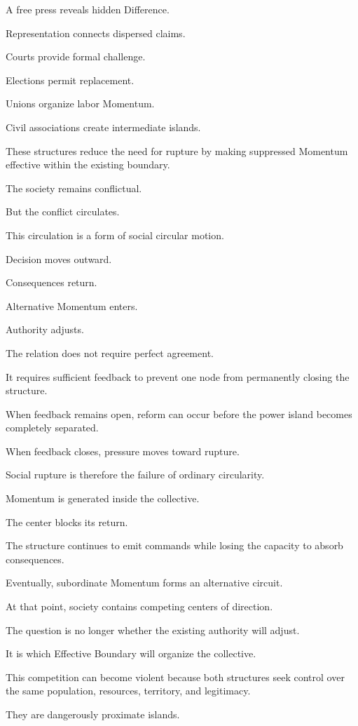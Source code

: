 A free press reveals hidden Difference.

Representation connects dispersed claims.

Courts provide formal challenge.

Elections permit replacement.

Unions organize labor Momentum.

Civil associations create intermediate islands.

These structures reduce the need for rupture by making suppressed Momentum effective within the existing boundary.

The society remains conflictual.

But the conflict circulates.

This circulation is a form of social circular motion.

Decision moves outward.

Consequences return.

Alternative Momentum enters.

Authority adjusts.

The relation does not require perfect agreement.

It requires sufficient feedback to prevent one node from permanently closing the structure.

When feedback remains open, reform can occur before the power island becomes completely separated.

When feedback closes, pressure moves toward rupture.

Social rupture is therefore the failure of ordinary circularity.

Momentum is generated inside the collective.

The center blocks its return.

The structure continues to emit commands while losing the capacity to absorb consequences.

Eventually, subordinate Momentum forms an alternative circuit.

At that point, society contains competing centers of direction.

The question is no longer whether the existing authority will adjust.

It is which Effective Boundary will organize the collective.

This competition can become violent because both structures seek control over the same population, resources, territory, and legitimacy.

They are dangerously proximate islands.

